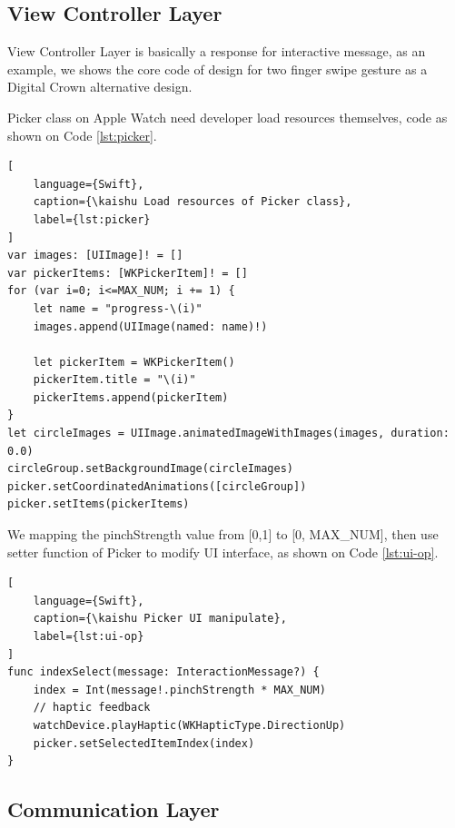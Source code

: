 \subsection{View Controller Layer}

View Controller Layer is basically a response for interactive message, as an example, we shows the core code of design for two finger swipe gesture as a Digital Crown alternative design.

Picker class on Apple Watch need developer load resources themselves, code as shown on Code \ref{lst:picker}.

\begin{lstlisting}[
    language={Swift},
    caption={\kaishu Load resources of Picker class},
    label={lst:picker}
]
var images: [UIImage]! = []
var pickerItems: [WKPickerItem]! = []
for (var i=0; i<=MAX_NUM; i += 1) {
    let name = "progress-\(i)"
    images.append(UIImage(named: name)!)

    let pickerItem = WKPickerItem()
    pickerItem.title = "\(i)"
    pickerItems.append(pickerItem)
}
let circleImages = UIImage.animatedImageWithImages(images, duration: 0.0)
circleGroup.setBackgroundImage(circleImages)
picker.setCoordinatedAnimations([circleGroup])
picker.setItems(pickerItems)
\end{lstlisting}

We mapping the pinchStrength value from [0,1] to [0, MAX\_NUM], then use setter function of Picker to modify UI interface, as shown on Code \ref{lst:ui-op}.

\begin{lstlisting}[
    language={Swift},
    caption={\kaishu Picker UI manipulate},
    label={lst:ui-op}
]
func indexSelect(message: InteractionMessage?) {
    index = Int(message!.pinchStrength * MAX_NUM)
    // haptic feedback
    watchDevice.playHaptic(WKHapticType.DirectionUp)
    picker.setSelectedItemIndex(index)
}
\end{lstlisting}

\subsection{Communication Layer}

